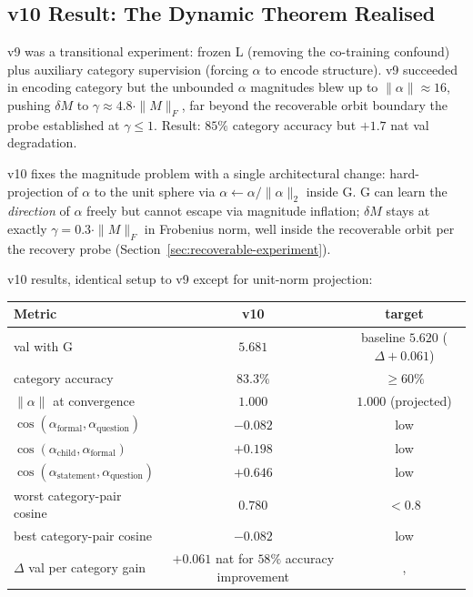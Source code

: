 \documentclass[11pt, a4paper]{article}
\theoremstyle{plain}
\theoremstyle{definition}
\theoremstyle{remark}
\begin{document}
\subsection{v10 Result: The Dynamic Theorem Realised}
\label{sec:v10-success}

v9 was a transitional experiment: frozen L (removing the co-training confound) plus auxiliary category supervision (forcing $\alpha$ to encode structure).
v9 succeeded in encoding category but the unbounded $\alpha$ magnitudes blew up to $\|\alpha\| \approx 16$, pushing $\delta M$ to $\gamma \approx 4.8 \cdot \|M\|_F$, far beyond the recoverable orbit boundary the probe established at $\gamma \leq 1$.
Result: $85\%$ category accuracy but $+1.7$ nat val degradation.

v10 fixes the magnitude problem with a single architectural change: hard-projection of $\alpha$ to the unit sphere via $\alpha \leftarrow \alpha / \|\alpha\|_2$ inside G.
G can learn the \emph{direction} of $\alpha$ freely but cannot escape via magnitude inflation; $\delta M$ stays at exactly $\gamma = 0.3 \cdot \|M\|_F$ in Frobenius norm, well inside the recoverable orbit per the recovery probe (Section~\ref{sec:recoverable-experiment}).

v10 results, identical setup to v9 except for unit-norm projection:

\begin{center}
\begin{tabular}{l c c}
\toprule
Metric & v10 & target \\
\midrule
val with G & $5.681$ & baseline $5.620$ ($\Delta {+}0.061$) \\
category accuracy & $\mathbf{83.3\%}$ & $\geq 60\%$ \\
$\|\alpha\|$ at convergence & $1.000$ & $1.000$ (projected) \\
$\cos(\alpha_{\text{formal}}, \alpha_{\text{question}})$ & $\mathbf{-0.082}$ & low \\
$\cos(\alpha_{\text{child}}, \alpha_{\text{formal}})$ & $\mathbf{+0.198}$ & low \\
$\cos(\alpha_{\text{statement}}, \alpha_{\text{question}})$ & $+0.646$ & low \\
worst category-pair cosine & $\mathbf{0.780}$ & $< 0.8$ \\
best category-pair cosine & $-0.082$ & low \\
$\Delta$ val per category gain & $+0.061$ nat for $58\%$ accuracy improvement & ,  \\
\bottomrule
\end{tabular}
\end{center}
\end{document}
